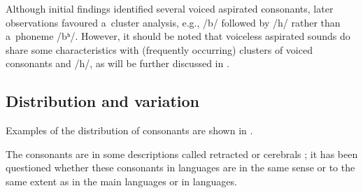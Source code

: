 Although initial findings identified several voiced aspirated consonants, later observations favoured a~cluster analysis, e.g., /b/ followed by /h/ rather than a~phoneme /bʰ/. However, it should be noted that voiceless aspirated sounds do share some characteristics with (frequently occurring) clusters of voiced consonants and /h/, as will be further discussed in .

\subsection{Distribution and variation}
\label{subsec:3-1-1}

Examples of the distribution of consonants are shown in . 


The  consonants are in some descriptions called retracted \citep[16]{schmidtkohistani2008} or cerebrals \citep{morgenstierne1941}; it has been questioned whether these consonants in  languages are  in the same sense or to the same extent as in the main  languages or in  languages. 


